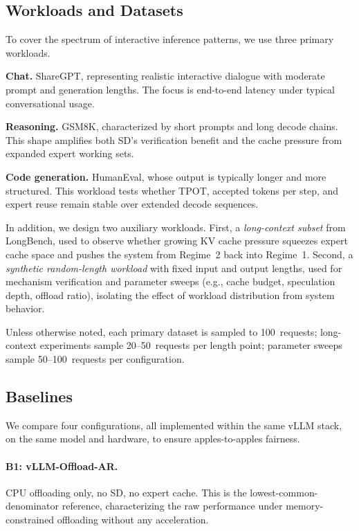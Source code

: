 \subsection{Workloads and Datasets}

To cover the spectrum of interactive inference patterns, we use three primary workloads.

\textbf{Chat.} ShareGPT, representing realistic interactive dialogue with moderate prompt and generation lengths. The focus is end-to-end latency under typical conversational usage.

\textbf{Reasoning.} GSM8K, characterized by short prompts and long decode chains. This shape amplifies both SD's verification benefit and the cache pressure from expanded expert working sets.

\textbf{Code generation.} HumanEval, whose output is typically longer and more structured. This workload tests whether TPOT, accepted tokens per step, and expert reuse remain stable over extended decode sequences.

In addition, we design two auxiliary workloads. First, a \emph{long-context subset} from LongBench, used to observe whether growing KV cache pressure squeezes expert cache space and pushes the system from Regime~2 back into Regime~1. Second, a \emph{synthetic random-length workload} with fixed input and output lengths, used for mechanism verification and parameter sweeps (e.g., cache budget, speculation depth, offload ratio), isolating the effect of workload distribution from system behavior.

Unless otherwise noted, each primary dataset is sampled to 100~requests; long-context experiments sample 20--50~requests per length point; parameter sweeps sample 50--100~requests per configuration.

\subsection{Baselines}

We compare four configurations, all implemented within the same vLLM stack, on the same model and hardware, to ensure apples-to-apples fairness.

\paragraph{B1: vLLM-Offload-AR.}
CPU offloading only, no SD, no expert cache. This is the lowest-common-denominator reference, characterizing the raw performance under memory-constrained offloading without any acceleration.

